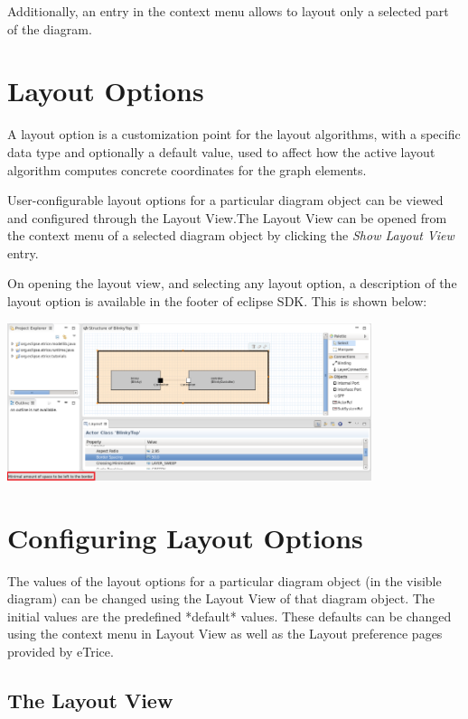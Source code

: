 Additionally, an entry in the context menu allows to layout only a selected part of the diagram.

\section{\label{layoutOptions}Layout Options}

A layout option is a customization point for the layout algorithms, with a specific data type and 
optionally a default value, used to affect how the active layout algorithm computes concrete coordinates 
for the graph elements.

User-configurable layout options for a particular diagram object can be viewed and configured through the 
Layout View.The Layout View can be opened from the context menu of a selected diagram object by clicking 
the \textit{Show Layout View} entry. 

On opening the layout view, and selecting any layout option, a description of the layout option is 
available in the footer of eclipse SDK. This is shown below:

\includegraphics[width=0.8\textwidth]{images/043-LayoutOptionDescription.png}

\section{\label{configureOptions}Configuring Layout Options}

The values of the layout options for a particular diagram object (in the visible diagram) can be changed 
using the Layout View of that diagram object. The initial values are the predefined *default* values. 
These defaults can be changed using the context menu in Layout View as well as the Layout preference pages 
provided by eTrice.

\subsection{\label{layoutView}The Layout View}

